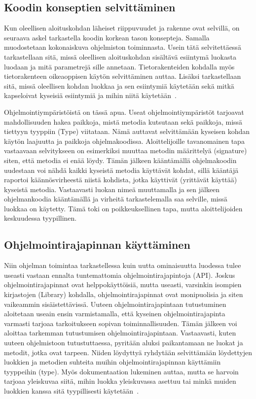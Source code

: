 \documentclass[finnish]{../tktltiki2}
\theoremstyle{definition}
\theoremstyle{remark}
\begin{document}
\subsection{Koodin konseptien selvittäminen}
Kun oleellisen aloituskohdan läheiset riippuvuudet ja rakenne ovat selvillä, on seuraava askel tarkastella koodin korkean tason konsepteja. Samalla muodostetaan kokonaiskuva ohjelmiston toiminnasta. Usein tätä selvitettäessä tarkastellaan sitä, missä oleellisen aloituskohdan sisältävä esiintymä luokasta luodaan ja mitä parametrejä sille annetaan. Tietorakenteiden kohdalla myös tietorakenteen oikeaoppisen käytön selvittäminen auttaa. Lisäksi tarkastellaan sitä, missä oleellisen kohdan luokkaa ja sen esiintymiä käytetään sekä mitkä kapseloivat kyseisiä esiintymiä ja mihin niitä käytetään~\cite{questions-during-software-evolution-tasks,eliciting-design-requirements-for-maintenance-oriented-ides}.

Ohjelmointiympäristöistä on tässä apua. Useat ohjelmointiympäristöt tarjoavat mahdollisuuden hakea paikkoja, mistä metodia kutsutaan sekä paikkoja, missä tiettyyn tyyppiin (Type) viitataan. Nämä auttavat selvittämään kyseisen kohdan käytön laajuutta ja paikkoja ohjelmakoodissa. Aloittelijoille tavanomainen tapa vastaavaan selvitykseen on esimerkiksi muuttaa metodin määrittelyä (signature) siten, että metodia ei enää löydy. Tämän jälkeen kääntämällä ohjelmakoodin uudestaan voi nähdä kaikki kyseistä metodia käyttävät kohdat, sillä kääntäjä raportoi käännösvirheestä niistä kohdista, jotka käyttivät (yrittävät käyttää) kyseistä metodia. Vastaavasti luokan nimeä muuttamalla ja sen jälkeen ohjelmankoodia kääntämällä ja virheitä tarkastelemalla saa selville, missä luokkaa on käytetty. Tämä toki on poikkeuksellinen tapa, mutta aloittelijoiden keskuudessa tyypillinen.

\subsection{Ohjelmointirajapinnan käyttäminen}
Niin ohjelman toimintaa tarkastellessa kuin uutta ominaisuutta luodessa tulee useasti vastaan ennalta tuntemattomia ohjelmointirajapintoja (API). Joskus ohjelmointirajapinnat ovat helppokäyttöisiä, mutta useasti, varsinkin isompien kirjastojen (Library) kohdalla, ohjelmointirajapinnat ovat monipuolisia ja siten vaikeammin sisäistettävissä.
Uuteen ohjelmointirajapintaan tutustuminen aloitetaan useain ensin varmistamalla, että kyseinen ohjelmointirajapinta varmasti tarjoaa tarkoitukseen sopivan toiminnallisuuden. Tämän jälkeen voi aloittaa tarkemman tutustumisen ohjelmointirajapintaan.
Vastaavasti, kuten uuteen ohjelmistoon tutustuttaessa, pyritään aluksi paikantamaan ne luokat ja metodit, jotka ovat tarpeen. Niiden löydyttyä ryhdytään selvittämään löydettyjen luokkien ja metodien suhteita muihin ohjelmointirajapinnan käyttämiin tyyppeihin (type). Myös dokumentaation lukeminen auttaa, mutta se harvoin tarjoaa yleiskuvaa siitä, mihin luokka yleiskuvassa asettuu tai minkä muiden luokkien kanssa sitä tyypillisesti käytetään~\cite{asking-and-answering-api-questions}.
\end{document}
